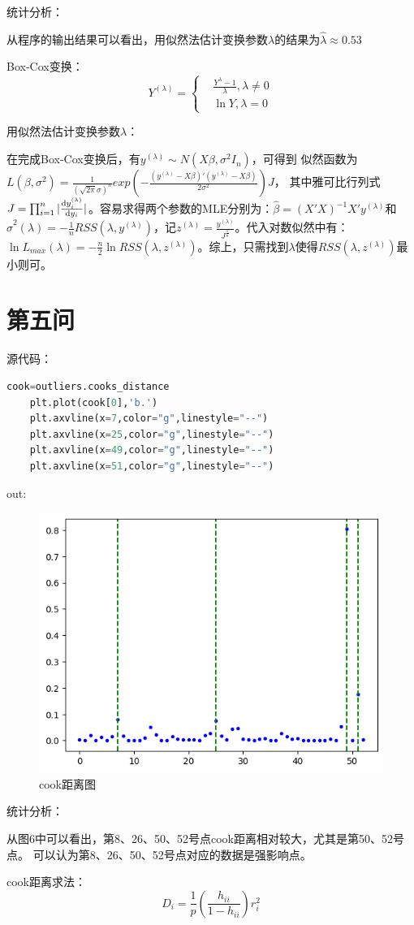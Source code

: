 \documentclass[a4paper,12pt]{article}
\begin{document}
统计分析：

从程序的输出结果可以看出，用似然法估计变换参数$\lambda$的结果为$\hat{\lambda}\approx 0.53$

Box-Cox变换：
\begin{equation*}
Y^{(\lambda)}=\left\{
	\begin{aligned}
		& \frac{Y^\lambda -1}{\lambda},\lambda\neq 0\\
		& \ln{Y},\lambda= 0
	\end{aligned}
\end{equation*}

用似然法估计变换参数$\lambda$：

在完成Box-Cox变换后，有$y^{(\lambda)}\sim N(X\beta,\sigma^2 I_n)$，可得到
似然函数为\\$L(\beta,\sigma^2)=\frac{1}{(\sqrt{2\pi}\sigma)^n}exp({-\frac{(y^{(\lambda)}-X\beta)'(y^{(\lambda)}-X\beta)}{2\sigma^2}})J$，
其中雅可比行列式$J=\prod_{i=1}^n|\frac{{\rm d}y_i^{(\lambda)}}{{\rm d}y_i}|$。容易求得两个参数的MLE分别为：$\hat{\beta}=(X'X)^{-1}X'y^{(\lambda)}$和
$\hat{\sigma}^2(\lambda)=-\frac{1}{n}RSS(\lambda,y^{(\lambda)})$，记$z^{(\lambda)}=\frac{y^{(\lambda)}}{J^\frac{1}{n}}$。代入对数似然中有：
$\ln L_{max}(\lambda)=-\frac{n}{2}\ln RSS(\lambda,z^{(\lambda)})$。综上，只需找到$\lambda$使得$RSS(\lambda,z^{(\lambda)})$最小则可。
\section{第五问}

源代码：
\begin{lstlisting}[language=python,breaklines]
	cook=outliers.cooks_distance
	plt.plot(cook[0],'b.')
	plt.axvline(x=7,color="g",linestyle="--")
	plt.axvline(x=25,color="g",linestyle="--")
	plt.axvline(x=49,color="g",linestyle="--")
	plt.axvline(x=51,color="g",linestyle="--")
\end{lstlisting}
out: 
\begin{figure}[htbp]
	\centering
	\includegraphics[scale=0.5]{out5.png}
	\caption{cook距离图}
\end{figure}

统计分析：

从图6中可以看出，第8、26、50、52号点cook距离相对较大，尤其是第50、52号点。
可以认为第8、26、50、52号点对应的数据是强影响点。

cook距离求法：
$$D_i=\frac{1}{p}(\frac{h_{ii}}{1-h_{ii}})r_i^2$$
\end{document}
